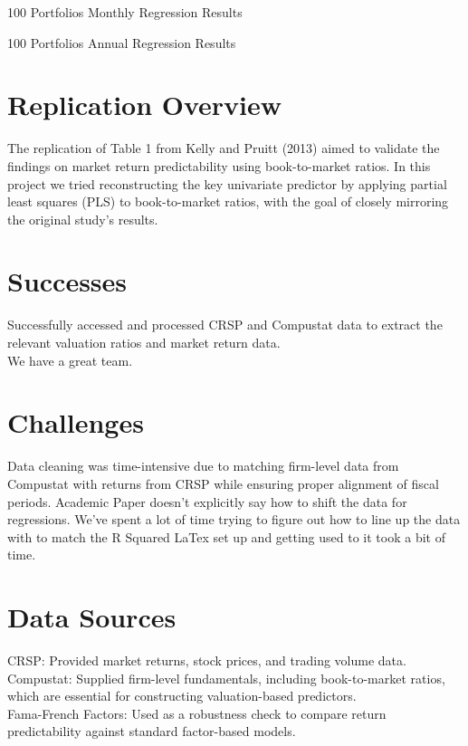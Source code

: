 \documentclass[12pt]{article}
\begin{document}
\begin{table}[ht]
    \centering
    \caption{100 Portfolios Monthly Regression Results}
    
\end{table}

\begin{table}[ht]
    \centering
    \caption{100 Portfolios Annual Regression Results}
    
\end{table}


\doublespacing
\section{Replication Overview}

The replication of Table 1 from Kelly and Pruitt (2013) aimed to validate the 
findings on market return predictability using book-to-market ratios. In this project we 
tried reconstructing the key univariate predictor by applying partial least squares (PLS) 
to book-to-market ratios, with the goal of closely mirroring the original study’s results.

\doublespacing
\section{Successes}
Successfully accessed and processed CRSP and Compustat data to extract the relevant valuation 
ratios and market return data.
\\We have a great team. 

\doublespacing
\section{Challenges}

Data cleaning was time-intensive due to matching firm-level data from Compustat with 
returns from CRSP while ensuring proper alignment of fiscal periods. Academic Paper doesn't 
explicitly say how to shift the data for regressions. 
We've spent a lot of time trying to figure out how to line up the data with to match the R Squared
LaTex set up and getting used to it took a bit of time. 

\doublespacing
\section{Data Sources}

CRSP: Provided market returns, stock prices, and trading volume data.
\\Compustat: Supplied firm-level fundamentals, including book-to-market ratios, 
which are essential for constructing valuation-based predictors.
\\Fama-French Factors: Used as a robustness check to compare return predictability against standard factor-based models.
\end{document}
